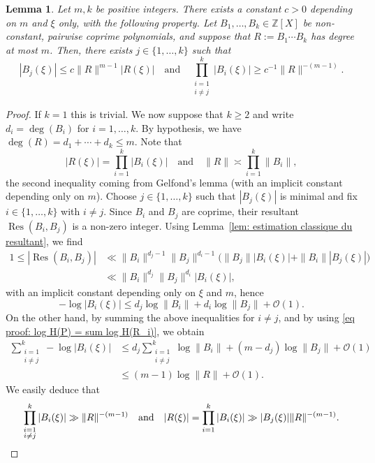 \documentclass[JEP,XML,SOM,Unicode,NoFloatCountersInSection,published]{cedram}
\DeclareMathOperator\Res{Res}
\newcommand\bZ{\mathbb{Z}}
\newcommand\GrO{\mathcal{O}}
\newcommand{\normH}[1]{\|#1\|}
\newcommand\AND{\quad\text{and}\quad}
\theoremstyle{definition}
\theoremstyle{plain}
\newtheorem{Lem}[Def]{Lemma}
\begin{document}
\begin{Lem}
\label{lem: lem general 2}
Let $m,k$ be positive integers. There exists a constant $c>0$ depending on $m$ and $\xi$ only, with the following property. Let $B_1,\dots,B_k\in\bZ[X]$ be non-constant, pairwise coprime polynomials, and suppose that $R:= B_1\cdots B_k$ has degree at most $m$. Then, there exists $j\in\{1,\dots,k\}$ such that
\[
|B_j(\xi)| \leq c\normH{R}^{m-1}|R(\xi)| \AND \prod_{\substack{i=1 \\ i\neq j}}^{k} |B_i(\xi)| \geq c^{-1}\normH{R}^{-(m-1)}.
\]
\end{Lem}

\begin{proof}
If $k=1$ this is trivial. We now suppose that $k\geq 2$ and write $d_i = \deg(B_i)$ for $i=1,\dots, k$. By hypothesis, we have $\deg(R) = d_1+\cdots + d_k \leq m$. Note that
\begin{equation}
\label{eq proof: log H(P) = sum log H(R_i)}
|R(\xi)| = \prod_{i=1}^{k} |B_i(\xi)| \AND \normH{R} \asymp \prod_{i=1}^{k} \normH{B_i},
\end{equation}
the second inequality coming from Gelfond's lemma (with an implicit constant depending only on $m$). Choose $j\in\{1,\dots,k\}$ such that $|B_j(\xi)|$ is minimal and fix $i\in\{1,\dots,k\}$ with $i\neq j$. Since $B_i$ and $B_j$ are coprime, their resultant $\Res(B_i,B_j)$ is a non-zero integer. Using Lemma~\ref{lem: estimation classique du resultant}, we find
\begin{align*}
1 \leq |\Res(B_i,B_j)| & \ll \normH{B_i}^{d_j-1} \normH{B_j}^{d_i-1}\big( \normH{B_j}|B_i(\xi)| + \normH{B_i}|B_j(\xi)|\big) \\
& \ll \normH{B_i}^{d_j} \normH{B_j}^{d_i}|B_i(\xi)|,
\end{align*}
with an implicit constant depending only on $\xi$ and $m$, hence
\[
-\log |B_i(\xi)| \leq d_j\log \normH{B_i} + d_i\log \normH{B_j} + \GrO(1).
\]
On the other hand, by summing the above inequalities for $i\neq j$, and by using \eqref{eq proof: log H(P) = sum log H(R_i)}, we obtain
\begin{align*}
\sum_{\substack{i=1 \\ i\neq j}}^{k} -\log |B_i(\xi)|
& \leq d_j\sum_{\substack{i=1 \\ i\neq j}}^{k} \log \normH{B_i} +(m-d_j) \log \normH{B_j} + \GrO(1) \\
& \leq (m-1)\log \normH{R} + \GrO(1).
\end{align*}
We easily deduce that
\[
\prod_{\substack{i=1 \\ i\neq j}}^{k} |B_i(\xi)| \gg \normH{R}^{-(m-1)} \AND
|R(\xi)| = \prod_{i=1}^{k}|B_i(\xi)| \gg |B_j(\xi)| \normH{R}^{- (m-1)}.\qedhere
\]
\end{proof}
\end{document}
